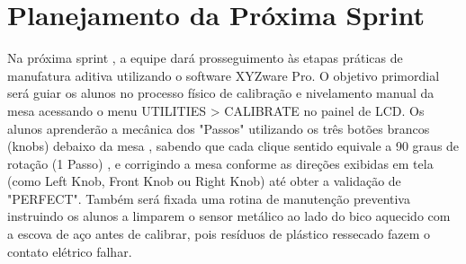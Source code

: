 \documentclass[12pt,a4paper]{article}
\begin{document}
\section{Planejamento da Próxima Sprint}
Na próxima sprint , a equipe dará prosseguimento às etapas práticas de manufatura aditiva utilizando o software XYZware Pro. O objetivo primordial será guiar os alunos no processo físico de calibração e nivelamento manual da mesa acessando o menu UTILITIES > CALIBRATE no painel de LCD. Os alunos aprenderão a mecânica dos "Passos" utilizando os três botões brancos (knobs) debaixo da mesa , sabendo que cada clique sentido equivale a 90 graus de rotação (1 Passo) , e corrigindo a mesa conforme as direções exibidas em tela (como Left Knob, Front Knob ou Right Knob) até obter a validação de "PERFECT". Também será fixada uma rotina de manutenção preventiva instruindo os alunos a limparem o sensor metálico ao lado do bico aquecido com a escova de aço antes de calibrar, pois resíduos de plástico ressecado fazem o contato elétrico falhar.
\end{document}
